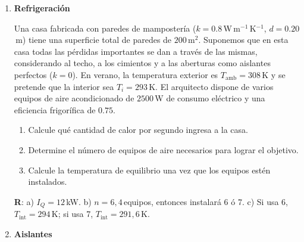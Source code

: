 \documentclass[a4paper,12pt]{article}
\begin{document}
\begin{enumerate}
	\item{\bf{Refrigeración}}
		
		Una casa fabricada con paredes de mampostería
		($k=0.8$\,W\,m$^{-1}$\,K$^{-1}$, $d=0.20$\,m) tiene una superficie
		total de paredes de $200$\,m$^2$. Suponemos que en esta casa todas las
		pérdidas importantes se dan a través de las mismas, considerando al
		techo, a los cimientos y a las aberturas como aislantes perfectos
		($k=0$).  En verano, la temperatura exterior es
		$T_{\mathrm{amb}}=308$\,K y se pretende que la interior sea
		$T_{i}=293$\,K. El arquitecto dispone de varios equipos de aire
		acondicionado de $2500$\,W de consumo eléctrico y una eficiencia
		frigorífica de $0.75$.
		\begin{enumerate}
			\item Calcule qué cantidad de calor por segundo ingresa a la casa.
			\item Determine el número de equipos de aire necesarios para lograr
				el objetivo.
			\item Calcule la temperatura de equilibrio una vez que los equipos
				estén instalados.
		\end{enumerate}
		{\bf{R}}: a) $I_Q=12$\,kW. b) $n=6,4$\,equipos, entonces instalará 6
		ó 7. c) Si usa 6, $T_{\mathrm{int}}=294$\,K; si usa 7,
		$T_{\mathrm{int}}=291,6$\,K. 
	
	\item{\bf{Aislantes}}
		

\end{enumerate}
\end{document}
